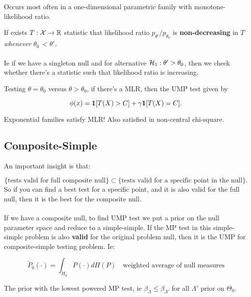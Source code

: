 \documentclass{article}
\begin{document}
 Occurs most often in a one-dimensional parametric family with monotone-likelihood ratio. 
\begin{definition}
If exists $T: \cal X \to \mathbb R$ statistic that likelihood ratio $p_{\theta'}/p_{\theta_0}$ is \textbf{non-decreasing} in $T$ \textit{whenever $\theta_0$ < $\theta'$. } \\\\
Ie if we have a singleton null and for alternative $\mathcal H_1: \theta'> \theta_0$, then we check whether there's a statistic such that likelihood ratio is increasing.  
\end{definition}


\begin{theorem}
Testing $\theta = \theta_0$ versus $\theta>\theta_0$, if there's a MLR, then the UMP test given by

$$\phi(x) = \boldsymbol{1}[T(X) > C ] + \gamma \boldsymbol{1}[T(X) = C].$$
\end{theorem}
\begin{fact}
Exponential families satisfy MLR! Also satisfied in non-central chi-square.
\end{fact}



\subsection{Composite-Simple}



An important insight is that:

$$\{ \text{tests valid for full composite null} \} \subset \{ \text{tests valid for a specific point in the null}\}.$$
So if you can find a best test for a specific point, and it is also valid for the full null, then it is the best for the composite null. \\\\

If we have a composite null, to find UMP test we put a prior on the null parameter space and reduce to a simple-simple. If the MP test in this simple-simple problem is also \textbf{valid} for the original problem null, then it is the UMP for composite-simple testing problem. Ie:

$$\tilde P_0 (\cdot) = \int_{H_0} P(\cdot) d\Pi(P) \quad \text{weighted average of null measures}$$
\begin{definition}
The prior with the lowest powered MP test, ie $\beta_{\Lambda} \leq \beta_{\Lambda'}$ for all $\Lambda'$ prior on $\Theta_0$. 
\end{definition}
\end{document}
